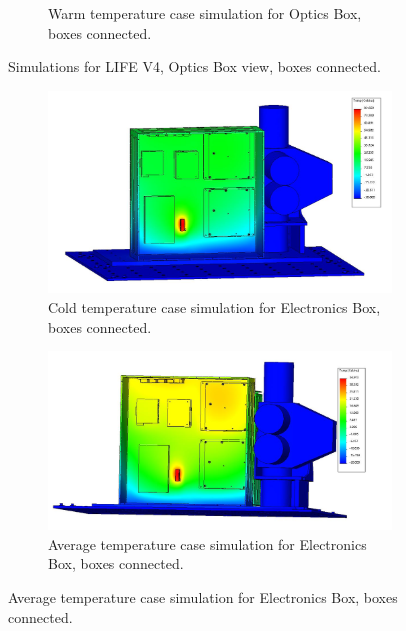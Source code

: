 \begin{figure}
\begin{subfigure}[h]{0.65\textwidth}
        \caption{Warm temperature case simulation for Optics Box, boxes connected.}
        \label{fig:LIFE_V4_TA_Optics_1c}
    \end{subfigure}
    \caption{Simulations for LIFE V4, Optics Box view, boxes connected.}
    \label{LIFE_V4_TA_1_Optics}
\end{figure}

\begin{figure}
    \centering
    \begin{subfigure}[h]{0.65\textwidth}
        \centering
        \includegraphics[width=\textwidth]{chap3_images/LIFE_V4_images/TA_Full_Model_Iter_1_ebox.JPG}
        \caption{Cold temperature case simulation for Electronics Box, boxes connected.}
        \label{fig:LIFE_V4_TA_Ebox_1a}
    \end{subfigure}
    \begin{subfigure}[h]{0.65\textwidth}
        \centering
        \includegraphics[width=\textwidth]{chap3_images/LIFE_V4_images/TA_Full_Model_Iter_2_ebox.JPG}
        \caption{Average temperature case simulation for Electronics Box, boxes connected.}
        \label{fig:LIFE_V4_TA_Ebox_1b}
    \end{subfigure}

\end{figure}
